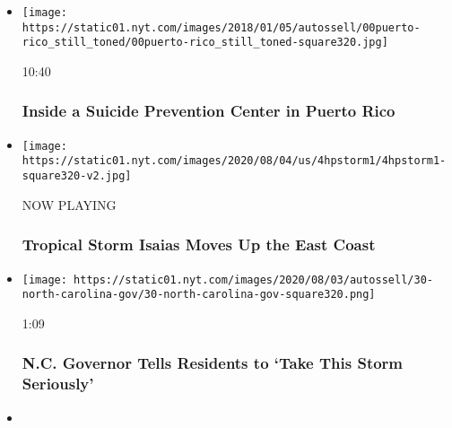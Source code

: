 \begin{itemize}
\item
  \href{https://www.nytimes.com/video/us/100000005620786/hurricane-maria-puerto-rico-mental-health.html?action=click\&module=video-series-bar\&region=header\&pgtype=Article\&playlistId=video/extreme-weather}{}

  \texttt{[image: https://static01.nyt.com/images/2018/01/05/autossell/00puerto-rico\_still\_toned/00puerto-rico\_still\_toned-square320.jpg]}

  10:40

  \hypertarget{inside-a-suicide-prevention-center-in-puerto-rico}{%
  \subsubsection{Inside a Suicide Prevention Center in Puerto
  Rico}\label{inside-a-suicide-prevention-center-in-puerto-rico}}
\item
  \texttt{[image: https://static01.nyt.com/images/2020/08/04/us/4hpstorm1/4hpstorm1-square320-v2.jpg]}

  NOW PLAYING

  \hypertarget{tropical-storm-isaias-moves-up-the-east-coast-1}{%
  \subsubsection{Tropical Storm Isaias Moves Up the East
  Coast}\label{tropical-storm-isaias-moves-up-the-east-coast-1}}
\item
  \href{https://www.nytimes.com/video/us/100000007271090/north-carolina-isaias-coronavirus.html?action=click\&module=video-series-bar\&region=header\&pgtype=Article\&playlistId=video/extreme-weather}{}

  \texttt{[image: https://static01.nyt.com/images/2020/08/03/autossell/30-north-carolina-gov/30-north-carolina-gov-square320.png]}

  1:09

  \hypertarget{nc-governor-tells-residents-to-take-this-storm-seriously}{%
  \subsubsection{N.C. Governor Tells Residents to `Take This Storm
  Seriously'}\label{nc-governor-tells-residents-to-take-this-storm-seriously}}
\item
  \href{https://www.nytimes.com/video/us/100000007258245/hurricane-douglas-hawaii.html?action=click\&module=video-series-bar\&region=header\&pgtype=Article\&playlistId=video/extreme-weather}{}


\end{itemize}
